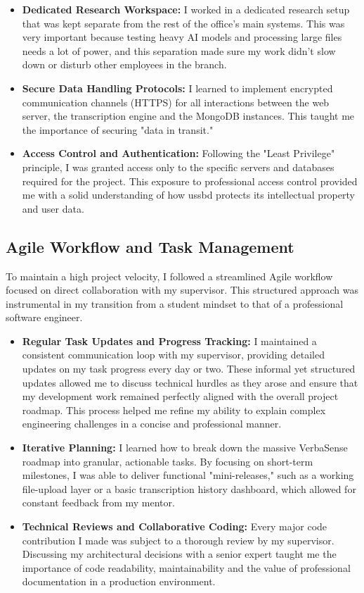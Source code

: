 \documentclass[oneside]{thesis-library}
\begin{document}
\begin{itemize}
    \item \textbf{Dedicated Research Workspace:} I worked in a dedicated research setup that was kept separate from the rest of the office's main systems. This was very important because testing heavy AI models and processing large files needs a lot of power, and this separation made sure my work didn't slow down or disturb other employees in the branch.
    \item \textbf{Secure Data Handling Protocols:} I learned to implement encrypted communication channels (HTTPS) for all interactions between the web server, the transcription engine and the MongoDB instances. This taught me the importance of securing "data in transit."
    \item \textbf{Access Control and Authentication:} Following the "Least Privilege" principle, I was granted access only to the specific servers and databases required for the project. This exposure to professional access control provided me with a solid understanding of how \Gls{ussbd} protects its intellectual property and user data.
\end{itemize}

\subsection{Agile Workflow and Task Management}
To maintain a high project velocity, I followed a streamlined Agile workflow focused on direct collaboration with my supervisor. This structured approach was instrumental in my transition from a student mindset to that of a professional software engineer.

\begin{itemize}
    \item \textbf{Regular Task Updates and Progress Tracking:} I maintained a consistent communication loop with my supervisor, providing detailed updates on my task progress every day or two. These informal yet structured updates allowed me to discuss technical hurdles as they arose and ensure that my development work remained perfectly aligned with the overall project roadmap. This process helped me refine my ability to explain complex engineering challenges in a concise and professional manner.
    \item \textbf{Iterative Planning:} I learned how to break down the massive VerbaSense roadmap into granular, actionable tasks. By focusing on short-term milestones, I was able to deliver functional "mini-releases," such as a working file-upload layer or a basic transcription history dashboard, which allowed for constant feedback from my mentor.
    \item \textbf{Technical Reviews and Collaborative Coding:} Every major code contribution I made was subject to a thorough review by my supervisor. Discussing my architectural decisions with a senior expert taught me the importance of code readability, maintainability and the value of professional documentation in a production environment.
\end{itemize}
\end{document}
